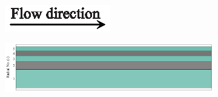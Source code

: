 \documentclass[preprint,12pt]{elsarticle}
\begin{document}
\begin{figure}[h!]
     \centering
     \begin{subfigure}[b]{\textwidth}
     	\includegraphics[width=\textwidth]{flow_dir.eps}
     \end{subfigure}
     \begin{subfigure}[b]{0.85\textwidth}
\includegraphics[width=\textwidth]{results/segments/5segEq/40C60T/seg.png}
     \end{subfigure}
     \hfill
     \begin{subfigure}[b]{0.1\textwidth}

\end{subfigure}
\end{figure}
\end{document}
